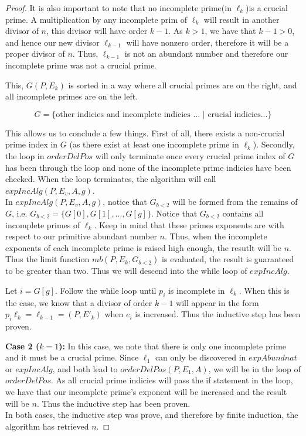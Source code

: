 \documentclass[../paper.tex]{subfiles}
\begin{document}
\begin{proof}
It is also important to note that no incomplete prime(in $\ell_k$)is a
crucial prime. A multiplication by any incomplete prim of $\ell_k$ 
will result in another divisor of $n$, this divisor will have order $k
- 1$. As $k > 1$, we have that $k - 1 > 0$, and hence our new
  divisor $\ell_{k-1}$ will have nonzero order, therefore it will be
a proper divisor of $n$. Thus, $\ell_{k-1}$ is not an abundant number
and therefore our incomplete prime was not a crucial prime.

This, $G(P,E_k)$ is sorted in a way where all crucial primes are on
the right, and all incomplete primes are on the left. 

$$ G = \{ \text{other indicies and incomplete indicies ... $|$ crucial
indicies...} \} $$

This allows us to conclude a few things. First of all,  there
exists a non-crucial prime index in $G$ (as there exist at
least one incomplete prime in $\ell_k$). Secondly, the loop in
$orderDelPos$ will only terminate once every crucial prime index of
$G$ has been through the loop and none of the incomplete prime
indicies have been checked. When the loop terminates, the 
algorithm will call $expIncAlg(P,E_v, A, g)$.
\\

In $expIncAlg(P,E_v,A, g)$, notice that $G_{b<2}$ will be formed
from the remains of $G$, i.e. $G_{b<2} = \{G[0], G[1], ...,
G[g]\}$. Notice that $G_{b<2}$ contains all incomplete primes
of $\ell_k$. Keep in mind that these primes exponents are with
respect to our primitive abundant number $n$. Thus, when the
incomplete exponents of each incomplete prime is raised high
enough,  the resutlt will be $n$. Thus the limit function
$mb(P,E_k, G_{b<2})$ is evaluated, the result is guaranteed to be
greater than two. Thus we will descend into the while loop of
$expIncAlg$. 

Let $i = G[g]$. Follow the while loop until $p_i$ is incomplete in
$\ell_k$. When this is the case, we know that a divisor of order $k -
1$ will appear in the form $p_i \ell_k = \ell_{k-1} = (P, E'_k)$ when
$e_i$ is increased. Thus the inductive step has been proven.

\textbf{Case 2 ($k = 1$):} In this case, we note that there is
only one incomplete prime and it must be a crucial prime.
Since $\ell_1$ can only be discovered in $expAbundnat$ or
$expIncAlg$, and both lead to $orderDelPos(P, E_1, A)$, we will be in
the loop of $orderDelPos$. As all crucial prime indicies will pass
the if statement in the loop, we have that our incomplete prime's
exponent will be increased and the result will be $n$. Thus the
inductive step has been proven.
\\

In both cases, the inductive step was prove, and therefore by
finite induction, the algorithm has retrieved $n$.

\end{proof}
\end{document}
